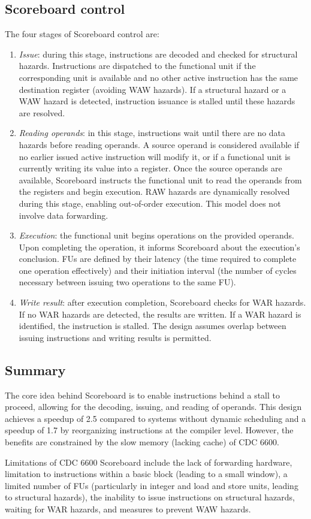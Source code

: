 \subsection{Scoreboard control}
The four stages of Scoreboard control are:
\begin{enumerate}
    \item \textit{Issue}: during this stage, instructions are decoded and checked for structural hazards. 
        Instructions are dispatched to the functional unit if the corresponding unit is available and no other active instruction has the same destination register (avoiding WAW hazards). 
        If a structural hazard or a WAW hazard is detected, instruction issuance is stalled until these hazards are resolved.
    \item \textit{Reading operands}: in this stage, instructions wait until there are no data hazards before reading operands. 
        A source operand is considered available if no earlier issued active instruction will modify it, or if a functional unit is currently writing its value into a register.
        Once the source operands are available, Scoreboard instructs the functional unit to read the operands from the registers and begin execution. 
        RAW hazards are dynamically resolved during this stage, enabling out-of-order execution. This model does not involve data forwarding.
    \item \textit{Execution}: the functional unit begins operations on the provided operands. 
        Upon completing the operation, it informs Scoreboard about the execution's conclusion. 
        FUs are defined by their latency (the time required to complete one operation effectively) and their initiation interval (the number of cycles necessary between issuing two operations to the same FU).
    \item \textit{Write result}: after execution completion, Scoreboard checks for WAR hazards. 
        If no WAR hazards are detected, the results are written. 
        If a WAR hazard is identified, the instruction is stalled. 
        The design assumes overlap between issuing instructions and writing results is permitted.
\end{enumerate}

\subsection{Summary}
The core idea behind Scoreboard is to enable instructions behind a stall to proceed, allowing for the decoding, issuing, and reading of operands. 
This design achieves a speedup of 2.5 compared to systems without dynamic scheduling and a speedup of 1.7 by reorganizing instructions at the compiler level. 
However, the benefits are constrained by the slow memory (lacking cache) of CDC 6600.

Limitations of CDC 6600 Scoreboard include the lack of forwarding hardware, limitation to instructions within a basic block (leading to a small window), a limited number of FUs (particularly in integer and load and store units, leading to structural hazards), the inability to issue instructions on structural hazards, waiting for WAR hazards, and measures to prevent WAW hazards.